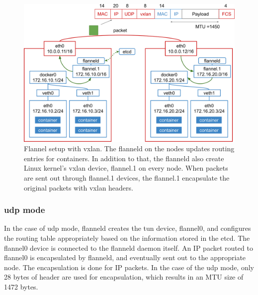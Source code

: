 \begin{figure}[h]
  \centering
  \includegraphics[width=0.95\columnwidth]{Figs/flannel-vxlan}

  \par\bigskip
  \centering
  \begin{minipage}{0.9\columnwidth}
    \caption[Flannel setup with vxlan]{
      Flannel setup with vxlan.
      The flanneld on the nodes updates routing entries for containers.
      In addition to that, the flanneld also create Linux kernel's vxlan device, flannel.1 on every node.
      When packets are sent out through flannel.1 devices, the flannel.1 encapsulate the original packets with vxlan headers.
    }
    \label{Figs/flannel-vxlan}
  \end{minipage}
\end{figure}

\FloatBarrier

\subsubsection{udp mode}

In the case of udp mode, flanneld creates the tun device, flannel0, and configures the routing table appropriately based on the information stored in the etcd.
The flannel0 device is connected to the flanneld daemon itself.
An IP packet routed to flannel0 is encapsulated by flanneld, and eventually sent out 
to the appropriate node. 
The encapsulation is done for IP packets.
In the case of the udp mode, only 28 bytes of header are used for encapsulation, which results in an MTU size of 1472 bytes.

